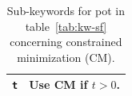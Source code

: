 \documentclass[a4paper,12pt,onecolumn]{article}
\begin{document}
\begin{table}[!h]
\caption{
Sub-keywords for \textrm{pot} in table~\ref{tab:kw-sf}
concerning constrained minimization (CM).
\label{tab:kw-co}
}
\begin{center}
\begin{tabular}{|l|l|}
\hline
\hline
\verb+t+         & Use CM if $t >0$. \\
\hline
\hline
\end{tabular}
\end{center}
\end{table}



















\end{document}
